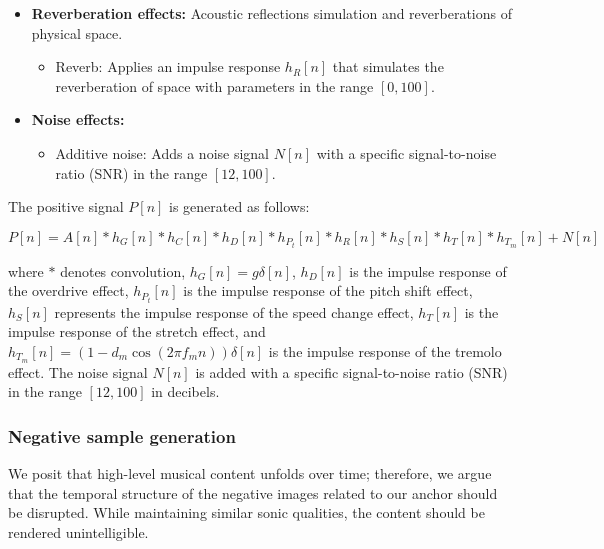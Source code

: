 \begin{itemize}
\item \textbf{Reverberation effects:} Acoustic reflections simulation and reverberations of physical space.
\begin{itemize}
    \item Reverb: Applies an impulse response $h_R[n]$ that simulates the reverberation of space with parameters in the range $[0, 100]$.
\end{itemize}

\item \textbf{Noise effects:}
\begin{itemize}
    \item Additive noise: Adds a noise signal $N[n]$ with a specific signal-to-noise ratio (SNR) in the range $[12, 100]$.
\end{itemize}
\end{itemize}

The positive signal $P[n]$ is generated as follows:

\begin{equation}\label{eq:positive_signal}
P[n] = A[n] \ast h_{G}[n] \ast h_{C}[n] \ast h_{D}[n] \ast h_{P_t}[n] \ast h_{R}[n] \ast h_{S}[n] \ast h_{T}[n] \ast h_{T_m}[n] + N[n]
\end{equation}

where $\ast$ denotes convolution, $h_{G}[n] = g \delta[n]$, $h_{D}[n]$ is the impulse response of the overdrive effect, $h_{P_t}[n]$ is the impulse response of the pitch shift effect, $h_{S}[n]$ represents the impulse response of the speed change effect, $h_{T}[n]$ is the impulse response of the stretch effect, and $h_{T_m}[n] = (1 - d_m \cos(2 \pi f_m n))\delta[n]$ is the impulse response of the tremolo effect. The noise signal $N[n]$ is added with a specific signal-to-noise ratio (SNR) in the range $[12, 100]$ in decibels.

\subsubsection{Negative sample generation}

We posit that high-level musical content unfolds over time; therefore, we argue that the temporal structure of the negative images related to our anchor should be disrupted. While maintaining similar sonic qualities, the content should be rendered unintelligible.

